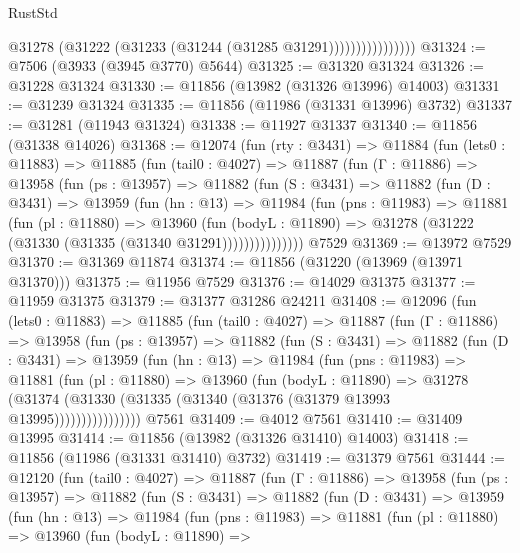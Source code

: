\begin{lexlean}{RustStd}
\begin{coremodule}
                          @31278 (@31222 (@31233 (@31244 (@31285 @31291))))))))))))))))
@31324 := @7506 (@3933 (@3945 @3770) @5644)
@31325 := @31320 @31324
@31326 := @31228 @31324
@31330 := @11856 (@13982 (@31326 @13996) @14003)
@31331 := @31239 @31324
@31335 := @11856 (@11986 (@31331 @13996) @3732)
@31337 := @31281 (@11943 @31324)
@31338 := @11927 @31337
@31340 := @11856 (@31338 @14026)
@31368 := @12074
    (fun (rty : @3431) =>
    @11884
      (fun (lets0 : @11883) =>
      @11885
        (fun (tail0 : @4027) =>
        @11887
          (fun (Γ : @11886) =>
          @13958
            (fun (ps : @13957) =>
            @11882
              (fun (S : @3431) =>
              @11882
                (fun (D : @3431) =>
                @13959
                  (fun (hn : @13) =>
                  @11984
                    (fun (pns : @11983) =>
                    @11881
                      (fun (pl : @11880) =>
                      @13960
                        (fun (bodyL : @11890) =>
                        @31278 (@31222 (@31330 (@31335 (@31340 @31291)))))))))))))))
    @7529
@31369 := @13972 @7529
@31370 := @31369 @11874
@31374 := @11856 (@31220 (@13969 (@13971 @31370)))
@31375 := @11956 @7529
@31376 := @14029 @31375
@31377 := @11959 @31375
@31379 := @31377 @31286 @24211
@31408 := @12096
    (fun (lets0 : @11883) =>
    @11885
      (fun (tail0 : @4027) =>
      @11887
        (fun (Γ : @11886) =>
        @13958
          (fun (ps : @13957) =>
          @11882
            (fun (S : @3431) =>
            @11882
              (fun (D : @3431) =>
              @13959
                (fun (hn : @13) =>
                @11984
                  (fun (pns : @11983) =>
                  @11881
                    (fun (pl : @11880) =>
                    @13960
                      (fun (bodyL : @11890) =>
                      @31278
                        (@31374
                          (@31330 (@31335 (@31340 (@31376 (@31379 @13993 @13995))))))))))))))))
    @7561
@31409 := @4012 @7561
@31410 := @31409 @13995
@31414 := @11856 (@13982 (@31326 @31410) @14003)
@31418 := @11856 (@11986 (@31331 @31410) @3732)
@31419 := @31379 @7561
@31444 := @12120
    (fun (tail0 : @4027) =>
    @11887
      (fun (Γ : @11886) =>
      @13958
        (fun (ps : @13957) =>
        @11882
          (fun (S : @3431) =>
          @11882
            (fun (D : @3431) =>
            @13959
              (fun (hn : @13) =>
              @11984
                (fun (pns : @11983) =>
                @11881
                  (fun (pl : @11880) =>
                  @13960
                    (fun (bodyL : @11890) =>

\end{coremodule}
\end{lexlean}
